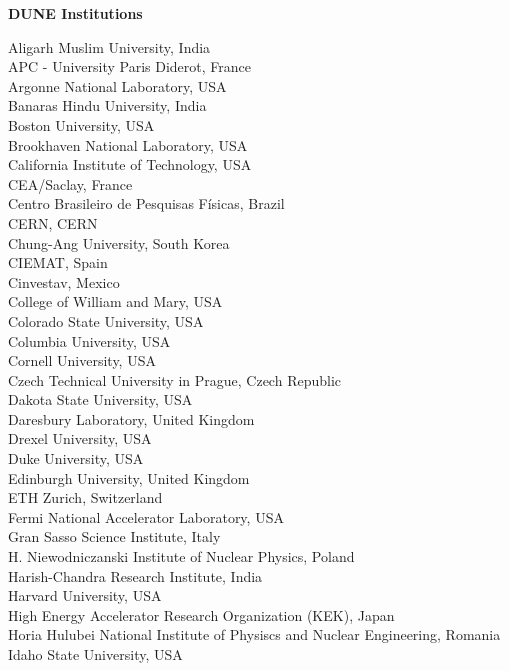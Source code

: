 
\begin{center}
  
\textbf{DUNE Institutions}

Aligarh Muslim University, India \\
APC - University Paris Diderot, France \\
Argonne National Laboratory, USA \\
Banaras Hindu University, India \\
Boston University, USA \\
Brookhaven National Laboratory, USA \\
California Institute of Technology, USA \\
CEA/Saclay, France \\
Centro Brasileiro de Pesquisas Físicas, Brazil \\
CERN, CERN \\
Chung-Ang University, South Korea \\
CIEMAT, Spain \\
Cinvestav, Mexico \\
College of William and Mary, USA \\
Colorado State University, USA \\
Columbia University, USA \\
Cornell University, USA \\
Czech Technical University in Prague, Czech Republic \\
Dakota State University, USA \\
Daresbury Laboratory, United Kingdom \\
Drexel University, USA \\
Duke University, USA \\
Edinburgh University, United Kingdom \\
ETH Zurich, Switzerland \\
Fermi National Accelerator Laboratory, USA \\
Gran Sasso Science Institute, Italy \\
H. Niewodniczanski Institute of Nuclear Physics, Poland \\
Harish-Chandra Research Institute, India \\
Harvard University, USA \\
High Energy Accelerator Research Organization (KEK), Japan \\
Horia Hulubei National Institute of Physiscs and Nuclear Engineering, Romania \\
Idaho State University, USA \\

\end{center}
